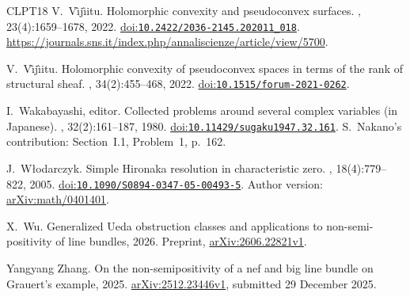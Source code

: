 \documentclass[11pt]{amsart}
\theoremstyle{definition}
\theoremstyle{remark}
\numberwithin{equation}{section}
\begin{document}
\begin{thebibliography}{CLPT18}
V.~V{\^\i}j{\^\i}itu.
\newblock Holomorphic convexity and pseudoconvex surfaces.
, 23(4):1659--1678, 2022.
\newblock \href{https://doi.org/10.2422/2036-2145.202011_018}{doi:\nolinkurl{10.2422/2036-2145.202011_018}}. \url{https://journals.sns.it/index.php/annaliscienze/article/view/5700}.

V.~V{\^\i}j{\^\i}itu.
\newblock Holomorphic convexity of pseudoconvex spaces in terms of the rank of structural sheaf.
, 34(2):455--468, 2022.
\newblock \href{https://doi.org/10.1515/forum-2021-0262}{doi:\nolinkurl{10.1515/forum-2021-0262}}.

I.~Wakabayashi, editor.
\newblock Collected problems around several complex variables (in Japanese).
, 32(2):161--187, 1980.
\newblock \href{https://doi.org/10.11429/sugaku1947.32.161}{doi:\nolinkurl{10.11429/sugaku1947.32.161}}.
\newblock S.~Nakano's contribution: Section~I.1, Problem~1, p.~162.

J.~W{\l}odarczyk.
\newblock Simple {Hironaka} resolution in characteristic zero.
, 18(4):779--822, 2005.
\newblock \href{https://doi.org/10.1090/S0894-0347-05-00493-5}{doi:\nolinkurl{10.1090/S0894-0347-05-00493-5}}. Author version: \href{https://arxiv.org/abs/math/0401401}{arXiv:math/0401401}.

X.~Wu.
\newblock Generalized {Ueda} obstruction classes and applications to non-semi-positivity of line bundles, 2026.
\newblock Preprint, \href{https://arxiv.org/abs/2606.22821v1}{arXiv:2606.22821v1}.

Yangyang Zhang.
\newblock On the non-semipositivity of a nef and big line bundle on {Grauert's} example, 2025.
\newblock \href{https://arxiv.org/abs/2512.23446v1}{arXiv:2512.23446v1}, submitted 29 December 2025.

\enlargethispage{\baselineskip}
\end{thebibliography}
\end{document}
